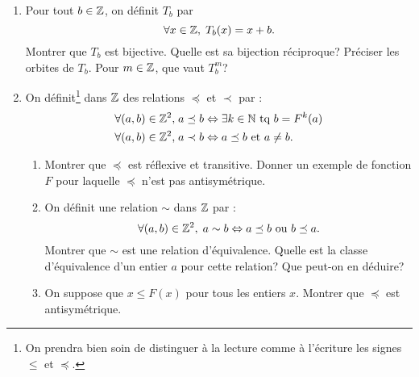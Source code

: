 \begin{enumerate}
 \item Pour tout $b\in \mathbb{Z}$, on définit $T_b$ par
\begin{displaymath}
 \forall x \in \mathbb{Z}, \; T_b(x) = x + b.
\end{displaymath}
Montrer que $T_b$ est bijective. Quelle est sa bijection réciproque? Préciser les orbites de $T_b$. Pour $m\in \mathbb{Z}$, que vaut $T_b^{m}$?

 \item On définit\footnote{On prendra bien soin de distinguer à la lecture comme à l'écriture les signes $\leq$ et $\preceq$.} dans $\mathbb{Z}$ des relations $\preceq$ et $\prec$ par :
\begin{displaymath}
\begin{aligned}
 \forall (a,b) \in \mathbb{Z}^2,\; &a\preceq b \Leftrightarrow \exists k \in \mathbb{N} \text{ tq } b = F^k(a)\\
 \forall (a,b) \in \mathbb{Z}^2,\; &a\prec b \Leftrightarrow a\preceq b \text{ et } a\neq b.
\end{aligned}
\end{displaymath}
\begin{enumerate}
 \item Montrer que $\preceq$ est réflexive et transitive. Donner un exemple de fonction $F$ pour laquelle $\preceq$ n'est pas antisymétrique.
 \item On définit une relation $\sim$ dans $\mathbb{Z}$ par :
\begin{displaymath}
 \forall (a,b)\in \mathbb{Z}^2, \; a \sim b \Leftrightarrow a \preceq b \text{ ou } b \preceq a.
\end{displaymath}
 Montrer que $\sim$ est une relation d'équivalence. Quelle est la classe d'équivalence d'un entier $a$ pour cette relation? Que peut-on en déduire?
 
 \item On suppose que $x \leq F(x)$ pour tous les entiers $x$. Montrer que $\preceq$ est antisymétrique.
\end{enumerate}
\end{enumerate}

